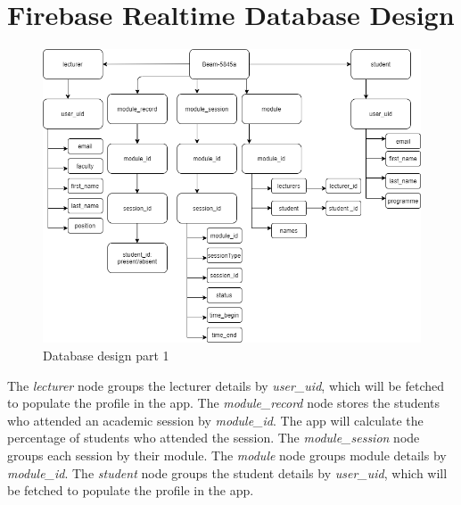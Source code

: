 \documentclass[../report.tex]{subfiles}
\begin{document}
\section{Firebase Realtime Database Design}
\begin{figure}[H]
\centering
\includegraphics[width=\textwidth]{./images/05-08-database-1.png}
\caption{Database design part 1}
\label{fig:database-design-1}
\end{figure}

The \textit{lecturer} node groups the lecturer details by \textit{user\_uid}, which will be fetched to populate the profile in the app. The \textit{module\_record} node stores the students who attended an academic session by \textit{module\_id}. The app will calculate the percentage of students who attended the session. The \textit{module\_session} node groups each session by their module. The \textit{module} node groups module details by \textit{module\_id}. The \textit{student} node groups the student details by \textit{user\_uid}, which will be fetched to populate the profile in the app.
\end{document}
